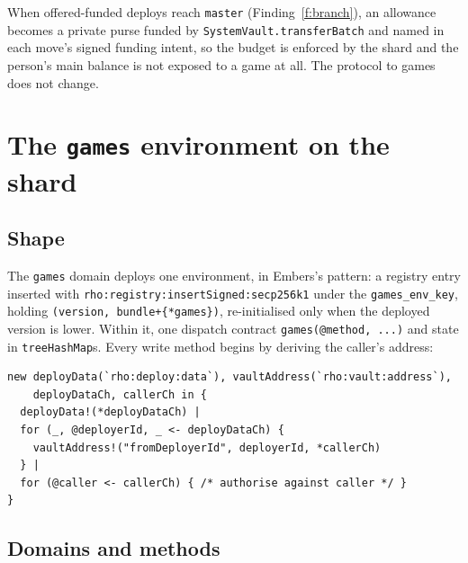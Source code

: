 \documentclass[11pt]{article}
\theoremstyle{definition}
\theoremstyle{remark}
\newcommand{\code}[1]{\texttt{#1}}
\newcommand{\Em}{Embers}
\begin{document}
When offered-funded deploys reach \code{master} (Finding~\ref{f:branch}), an
allowance becomes a private purse funded by \code{SystemVault.transferBatch} and
named in each move's signed funding intent, so the budget is enforced by the shard
and the person's main balance is not exposed to a game at all. The protocol to games
does not change.

\section{The \code{games} environment on the shard}\label{sec:env}

\subsection{Shape}

The \code{games} domain deploys one environment, in \Em{}'s pattern: a registry
entry inserted with \code{rho:registry:insertSigned:secp256k1} under the
\code{games\_env\_key}, holding \code{(version, bundle+\{*games\})}, re-initialised
only when the deployed version is lower. Within it, one dispatch contract
\code{games(@method, ...)} and state in \code{treeHashMap}s. Every write method begins
by deriving the caller's address:

\begin{lstlisting}[language=Rho]
new deployData(`rho:deploy:data`), vaultAddress(`rho:vault:address`),
    deployDataCh, callerCh in {
  deployData!(*deployDataCh) |
  for (_, @deployerId, _ <- deployDataCh) {
    vaultAddress!("fromDeployerId", deployerId, *callerCh)
  } |
  for (@caller <- callerCh) { /* authorise against caller */ }
}
\end{lstlisting}

\subsection{Domains and methods}
\end{document}
